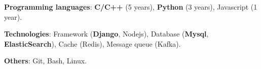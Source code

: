 \begin{cvempty} %
    \begin{cvitems} %
        \item{\textbf{Programming languages}: \textbf{C/C++} (5 years), \textbf{Python} (3 years), Javascript (1 year).}
        \item{\textbf{Technologies}: Framework (\textbf{Django}, Nodejs), Database (\textbf{Mysql}, \textbf{ElasticSearch}), Cache (Redis), Message queue (Kafka).}
        \item{\textbf{Others}: Git, Bash, Linux.}
    \end{cvitems}
\end{cvempty}
